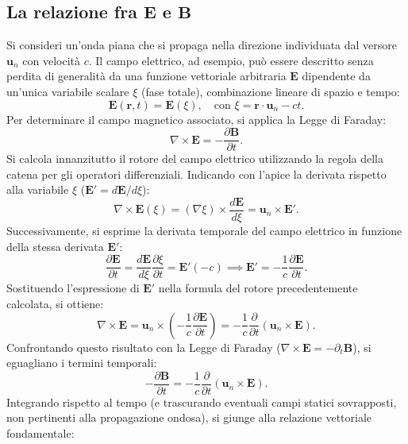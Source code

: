 \documentclass[a4paper,11pt]{report}
\begin{document}
\subsection{La relazione fra $\bm{E}$ e $\bm{B}$}
Si consideri un'onda piana che si propaga nella direzione individuata dal versore $\bm{u}_n$ con velocità $c$. Il campo elettrico, ad esempio, può essere descritto senza perdita di generalità da una funzione vettoriale arbitraria $\bm{E}$ dipendente da un'unica variabile scalare $\xi$ (fase totale), combinazione lineare di spazio e tempo:
\begin{equation}
\bm{E}(\bm{r}, t) = \bm{E}(\xi), \quad \text{con } \xi = \bm{r} \cdot \bm{u}_n - ct.
\label{eq:onde3d}
\end{equation}
Per determinare il campo magnetico associato, si applica la Legge di Faraday:
\begin{equation}
\nabla \times \bm{E} = -\frac{\partial \bm{B}}{\partial t}.
\end{equation}
Si calcola innanzitutto il rotore del campo elettrico utilizzando la regola della catena per gli operatori differenziali. Indicando con l'apice la derivata rispetto alla variabile $\xi$ ($\bm{E}' = d\bm{E}/d\xi$):
\begin{equation}
\nabla \times \bm{E}(\xi) = (\nabla \xi) \times \frac{d\bm{E}}{d\xi} = \bm{u}_n \times \bm{E}'.
\end{equation}
Successivamente, si esprime la derivata temporale del campo elettrico in funzione della stessa derivata $\bm{E}'$:
\begin{equation}
\frac{\partial \bm{E}}{\partial t} = \frac{d\bm{E}}{d\xi} \frac{\partial \xi}{\partial t} = \bm{E}' (-c) \implies \bm{E}' = -\frac{1}{c} \frac{\partial \bm{E}}{\partial t}.
\end{equation}
Sostituendo l'espressione di $\bm{E}'$ nella formula del rotore precedentemente calcolata, si ottiene:
\begin{equation}
\nabla \times \bm{E} = \bm{u}_n \times \left( -\frac{1}{c} \frac{\partial \bm{E}}{\partial t} \right) = -\frac{1}{c} \frac{\partial}{\partial t} (\bm{u}_n \times \bm{E}).
\end{equation}
Confrontando questo risultato con la Legge di Faraday ($\nabla \times \bm{E} = -\partial_t \bm{B}$), si eguagliano i termini temporali:
\begin{equation}
-\frac{\partial \bm{B}}{\partial t} = -\frac{1}{c} \frac{\partial}{\partial t} (\bm{u}_n \times \bm{E}).
\end{equation}
Integrando rispetto al tempo (e trascurando eventuali campi statici sovrapposti, non pertinenti alla propagazione ondosa), si giunge alla relazione vettoriale fondamentale:
\end{document}
